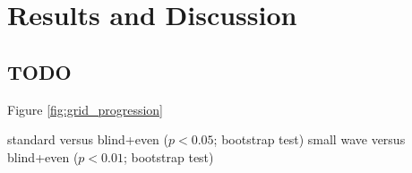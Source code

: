 \section{Results and Discussion}



\subsection{TODO}

Figure \ref{fig:grid_progression}

standard versus blind+even ($p < 0.05$; bootstrap test)
small wave versus blind+even ($p < 0.01$; bootstrap test)
